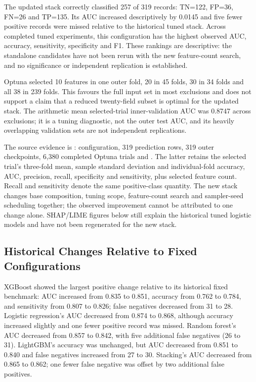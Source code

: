 The updated stack correctly classified 257 of 319 records: TN=122, FP=36, FN=26 and TP=135. Its AUC increased descriptively by 0.0145 and five fewer positive records were missed relative to the historical tuned stack. Across completed tuned experiments, this configuration has the highest observed AUC, accuracy, sensitivity, specificity and F1. These rankings are descriptive: the standalone candidates have not been rerun with the new feature-count search, and no significance or independent replication is established.

Optuna selected 10 features in one outer fold, 20 in 45 folds, 30 in 34 folds and all 38 in 239 folds. This favours the full input set in most exclusions and does not support a claim that a reduced twenty-field subset is optimal for the updated stack. The arithmetic mean selected-trial inner-validation AUC was 0.8747 across exclusions; it is a tuning diagnostic, not the outer test AUC, and its heavily overlapping validation sets are not independent replications.

The source evidence is : configuration, 319 prediction rows, 319 outer checkpoints, 6,380 completed Optuna trials and . The latter retains the selected trial's three-fold mean, sample standard deviation and individual-fold accuracy, AUC, precision, recall, specificity and sensitivity, plus selected feature count. Recall and sensitivity denote the same positive-class quantity. The new stack changes base composition, tuning scope, feature-count search and sampler-seed scheduling together; the observed improvement cannot be attributed to one change alone. SHAP/LIME figures below still explain the historical tuned logistic models and have not been regenerated for the new stack.

\subsection{Historical Changes Relative to Fixed Configurations}
XGBoost showed the largest positive change relative to its historical fixed benchmark: AUC increased from 0.835 to 0.851, accuracy from 0.762 to 0.784, and sensitivity from 0.807 to 0.826; false negatives decreased from 31 to 28. Logistic regression's AUC decreased from 0.874 to 0.868, although accuracy increased slightly and one fewer positive record was missed. Random forest's AUC decreased from 0.857 to 0.842, with five additional false negatives (26 to 31). LightGBM's accuracy was unchanged, but AUC decreased from 0.851 to 0.840 and false negatives increased from 27 to 30. Stacking's AUC decreased from 0.865 to 0.862; one fewer false negative was offset by two additional false positives.

